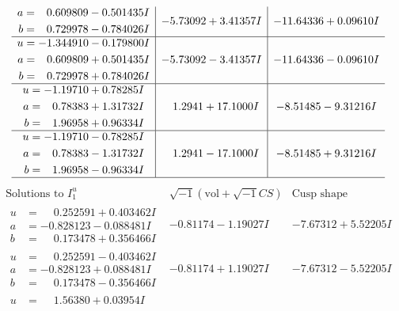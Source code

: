 \documentclass[1p]{elsarticle_modified}
\theoremstyle{definition}
\newcommand{\I}{\sqrt{-1}}
\begin{document}
$$\begin{array}{c|c|c}
\begin{aligned}
a &= \phantom{-}0.609809 - 0.501435 I \\
b &= \phantom{-}0.729978 - 0.784026 I\end{aligned}
 & -5.73092 + 3.41357 I & -11.64336 + 0.09610 I \\ \hline\begin{aligned}
u &= -1.344910 - 0.179800 I \\
a &= \phantom{-}0.609809 + 0.501435 I \\
b &= \phantom{-}0.729978 + 0.784026 I\end{aligned}
 & -5.73092 - 3.41357 I & -11.64336 - 0.09610 I \\ \hline\begin{aligned}
u &= -1.19710 + 0.78285 I \\
a &= \phantom{-}0.78383 + 1.31732 I \\
b &= \phantom{-}1.96958 + 0.96334 I\end{aligned}
 & \phantom{-}1.2941 + 17.1000 I & -8.51485 - 9.31216 I \\ \hline\begin{aligned}
u &= -1.19710 - 0.78285 I \\
a &= \phantom{-}0.78383 - 1.31732 I \\
b &= \phantom{-}1.96958 - 0.96334 I\end{aligned}
 & \phantom{-}1.2941 - 17.1000 I & -8.51485 + 9.31216 I\\
 \hline 
 \end{array}$$\newpage$$\begin{array}{c|c|c}  
\text{Solutions to }I^u_{1}& \I (\text{vol} + \sqrt{-1}CS) & \text{Cusp shape}\\
 \hline 
\begin{aligned}
u &= \phantom{-}0.252591 + 0.403462 I \\
a &= -0.828123 - 0.088481 I \\
b &= \phantom{-}0.173478 + 0.356466 I\end{aligned}
 & -0.81174 - 1.19027 I & -7.67312 + 5.52205 I \\ \hline\begin{aligned}
u &= \phantom{-}0.252591 - 0.403462 I \\
a &= -0.828123 + 0.088481 I \\
b &= \phantom{-}0.173478 - 0.356466 I\end{aligned}
 & -0.81174 + 1.19027 I & -7.67312 - 5.52205 I \\ \hline\begin{aligned}
u &= \phantom{-}1.56380 + 0.03954 I \\

\end{aligned}
\end{array}$$
\end{document}
